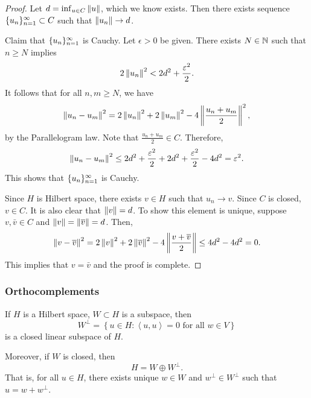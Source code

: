 \documentclass[a4paper]{article}
\renewcommand{\braket}[2]{\left\langle #1, #1 \right\rangle}
\begin{document}
\begin{proof}
  Let $d = \inf_{u \in C} \left\lVert u\right\rVert$, which we know exists.
  Then there exists sequence $\{ u_n \}_{n=1}^\infty \subset C$ such
  that $\left\lVert u_n\right\rVert \to d$.

  Claim that $\{ u_n \}_{n=1}^\infty$ is
  Cauchy. Let $\epsilon > 0$ be given. There exists
  $N \in \mathbb{N}$ such that $n \geq N$ implies
  \[
    2 \left\lVert u_n\right\rVert^2
    < 2 d^2 + \frac{\varepsilon^2}{2}.
  \]
  It follows that for
  all $n, m \geq N$, we have
  \[
    \left\lVert u_n - u_m\right\rVert^2 = 2 \left\lVert u_n\right\rVert^2 + 2 \left\lVert u_m\right\rVert^2
    - 4 \left\lVert \frac{u_n + u_m}{2}\right\rVert^2,
  \]
  by the Parallelogram law. Note that $\frac{u_n + u_m}{2} \in C$.
  Therefore,
  \[
    \left\lVert u_n - u_m\right\rVert^2 \leq 2 d^2 + \frac{\varepsilon^2}{2}
    + 2 d^2 + \frac{\varepsilon^2}{2} - 4d^2 = \varepsilon^2.
  \]
  This shows that $\{ u_n \}_{n=1}^\infty$ is Cauchy.

  Since $H$ is Hilbert space, there exists $v \in H$
  such that $u_n \to v$. Since $C$ is closed, $v \in C$.
  It is also clear that $\left\lVert v\right\rVert = d$. To show this
  element is unique, suppose $v, \bar{v} \in C$
  and $\left\lVert v\right\rVert = \left\lVert \overline{v}\right\rVert = d$. Then,
  \[
    \begin{aligned}
      \left\lVert v - \overline{v}\right\rVert^2
      = 2 \left\lVert v\right\rVert^2 + 2 \left\lVert \overline{v}\right\rVert^2
      - 4 \left\lVert \frac{v + \overline{v}}{2}\right\rVert
      \leq 4d^2 - 4d^2
      = 0.
    \end{aligned}
  \]
  This implies that $v = \bar{v}$ and the proof
  is complete.
\end{proof}

\subsubsection*{Orthocomplements}
\begin{thm}
  If $H$ is a Hilbert space, $W \subset H$ is a subspace,
  then
  \[
    W^\perp = \left\{ u \in H : \braket{u}{w} = 0
    \text{ for all } w \in V \right\}
  \]
  is a closed linear subspace of $H$.

  Moreover, if $W$ is closed, then
  \[
    H = W \oplus W^\perp.
  \]
  That is, for all $u \in H$, there exists
  unique $w \in W$ and $w^\perp \in W^\perp$ such that
  $u = w + w^\perp$.
\end{thm}
\end{document}
